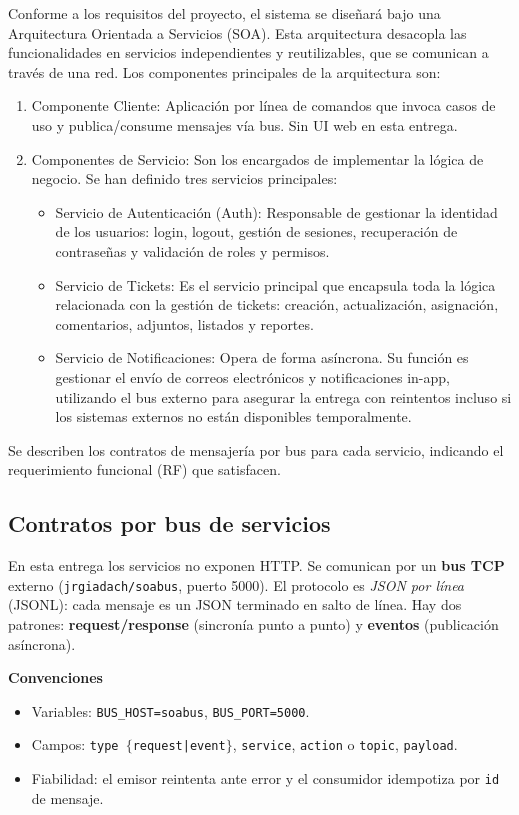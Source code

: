 \documentclass[letter,12pt]{article}
\begin{document}
Conforme a los requisitos del proyecto, el sistema se diseñará bajo una Arquitectura Orientada a Servicios (SOA). Esta arquitectura desacopla las funcionalidades en servicios independientes y reutilizables, que se comunican a través de una red.  
Los componentes principales de la arquitectura son:
\begin{enumerate}[leftmargin=*]
    \item Componente Cliente: Aplicación por línea de comandos que invoca casos de uso 
y publica/consume mensajes vía bus. Sin UI web en esta entrega.

    \item Componentes de Servicio: Son los encargados de implementar la lógica de negocio. Se han definido tres servicios principales:  
\begin{itemize}
    \item Servicio de Autenticación (Auth): Responsable de gestionar la identidad de los usuarios: login, logout, gestión de sesiones, recuperación de contraseñas y validación de roles y permisos.
    \item Servicio de Tickets: Es el servicio principal que encapsula toda la lógica relacionada con la gestión de tickets: creación, actualización, asignación, comentarios, adjuntos, listados y reportes.
    \item Servicio de Notificaciones: Opera de forma asíncrona. Su función es gestionar el envío de correos electrónicos y notificaciones in-app, utilizando el bus externo para asegurar la entrega con reintentos incluso si los sistemas externos no están disponibles temporalmente.
\end{itemize}
\end{enumerate}
Se describen los contratos de mensajería por bus para cada servicio, indicando el requerimiento funcional (RF) que satisfacen.  

 \subsection*{Contratos por bus de servicios}
En esta entrega los servicios no exponen HTTP. Se comunican por un \textbf{bus TCP} externo
(\texttt{jrgiadach/soabus}, puerto 5000). El protocolo es \emph{JSON por línea} (JSONL): cada
mensaje es un JSON terminado en salto de línea. Hay dos patrones:
\textbf{request/response} (sincronía punto a punto) y \textbf{eventos} (publicación asíncrona).

\noindent\textbf{Convenciones}
\begin{itemize}
  \item Variables: \texttt{BUS\_HOST=soabus}, \texttt{BUS\_PORT=5000}.
  \item Campos: \texttt{type $\{$request|event$\}$}, \texttt{service}, \texttt{action} o \texttt{topic}, \texttt{payload}.
  \item Fiabilidad: el emisor reintenta ante error y el consumidor idempotiza por \texttt{id} de mensaje.
\end{itemize}
\end{document}
